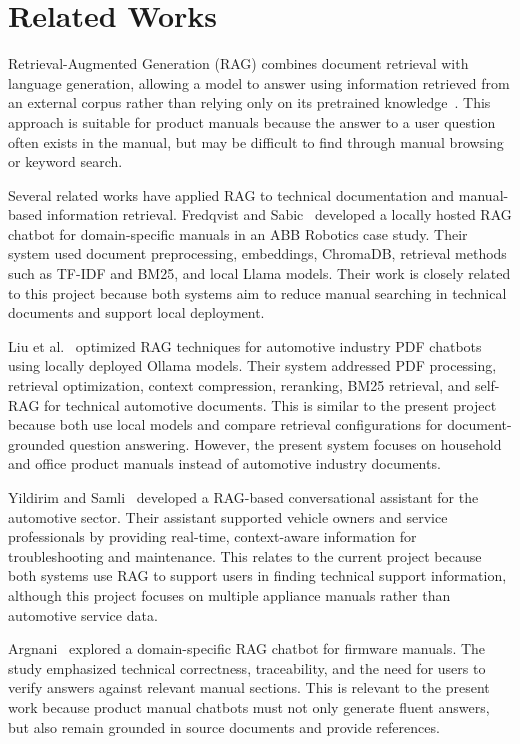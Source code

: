 \section{Related Works}

Retrieval-Augmented Generation (RAG) combines document retrieval with language generation, allowing a model to answer using information retrieved from an external corpus rather than relying only on its pretrained knowledge~\cite{lewis2020rag}. This approach is suitable for product manuals because the answer to a user question often exists in the manual, but may be difficult to find through manual browsing or keyword search.

Several related works have applied RAG to technical documentation and manual-based information retrieval. Fredqvist and Sabic~\cite{fredqvist2025ragchatbot} developed a locally hosted RAG chatbot for domain-specific manuals in an ABB Robotics case study. Their system used document preprocessing, embeddings, ChromaDB, retrieval methods such as TF-IDF and BM25, and local Llama models. Their work is closely related to this project because both systems aim to reduce manual searching in technical documents and support local deployment.

Liu et al.~\cite{liu2024automotivepdfchatbots} optimized RAG techniques for automotive industry PDF chatbots using locally deployed Ollama models. Their system addressed PDF processing, retrieval optimization, context compression, reranking, BM25 retrieval, and self-RAG for technical automotive documents. This is similar to the present project because both use local models and compare retrieval configurations for document-grounded question answering. However, the present system focuses on household and office product manuals instead of automotive industry documents.

Yildirim and Samli~\cite{yildirim2025automotiveassistant} developed a RAG-based conversational assistant for the automotive sector. Their assistant supported vehicle owners and service professionals by providing real-time, context-aware information for troubleshooting and maintenance. This relates to the current project because both systems use RAG to support users in finding technical support information, although this project focuses on multiple appliance manuals rather than automotive service data.

Argnani~\cite{argnani2025firmwaremanuals} explored a domain-specific RAG chatbot for firmware manuals. The study emphasized technical correctness, traceability, and the need for users to verify answers against relevant manual sections. This is relevant to the present work because product manual chatbots must not only generate fluent answers, but also remain grounded in source documents and provide references.

